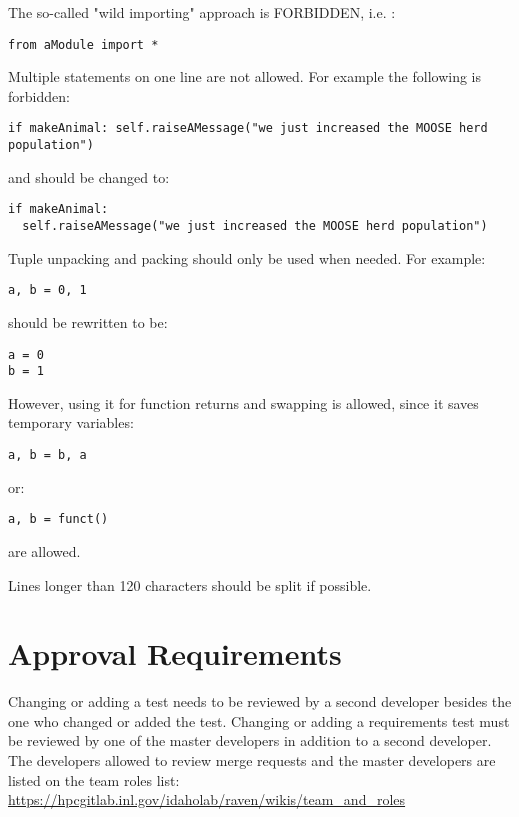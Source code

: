 \documentclass{article}
\begin{document}
The so-called "wild importing" approach is FORBIDDEN, i.e. :

\begin{verbatim}
from aModule import *
\end{verbatim}

Multiple statements on one line are not allowed. For example the
following is forbidden:

\begin{verbatim}
if makeAnimal: self.raiseAMessage("we just increased the MOOSE herd population")
\end{verbatim}

and should be changed to:

\begin{verbatim}
if makeAnimal:
  self.raiseAMessage("we just increased the MOOSE herd population")
\end{verbatim}

Tuple unpacking and packing should only be used when needed. For example:

\begin{verbatim}
a, b = 0, 1
\end{verbatim}

should be rewritten to be:

\begin{verbatim}
a = 0
b = 1
\end{verbatim}

However, using it for function returns and swapping is allowed, since
it saves temporary variables:

\begin{verbatim}
a, b = b, a
\end{verbatim}

or:

\begin{verbatim}
a, b = funct()
\end{verbatim}

are allowed.

Lines longer than 120 characters should be split if possible.

\section{Approval Requirements}

Changing or adding a test needs to be reviewed by a second developer
besides the one who changed or added the test.  Changing or adding a
requirements test must be reviewed by one of the master developers in
addition to a second developer.  The developers allowed to review
merge requests and the master developers are listed on the team roles
list:
\url{https://hpcgitlab.inl.gov/idaholab/raven/wikis/team_and_roles}
\end{document}
